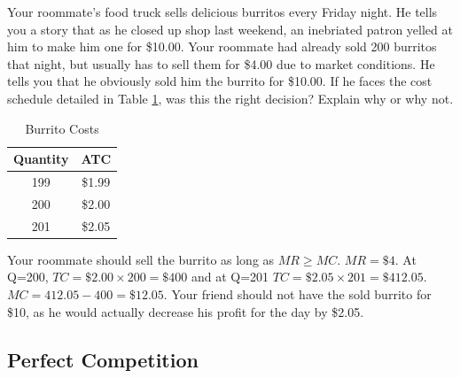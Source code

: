 \documentclass[addpoints,11pt]{exam}
\theoremstyle{definition}
\begin{document}
\begin{questions}
		\question Your roommate's food truck sells delicious burritos every Friday night. He tells you a story that as he closed up shop last weekend, an inebriated patron yelled at him to make him one for \$10.00. Your roommate had already sold 200 burritos that night, but usually has to sell them for \$4.00 due to market conditions. He tells you that he obviously sold him the burrito for \$10.00. If he faces the cost schedule detailed in Table \ref{tab5}, was this the right decision? Explain why or why not. 
		
		
		\begin{table}[H]
			\caption{Burrito Costs}
			\centering
			\begin{tabular}{ c|c}        
				
				Quantity  & ATC \\
				\hline
				199 & \$1.99 \\
				200 & \$2.00 \\
				201 & \$2.05 \\
			\end{tabular}
			\label{tab5}
		\end{table}
		
		\begin{solution}
			Your roommate should sell the burrito as long as $MR \ge MC$. $MR = \$4.$ At Q=200, $TC = \$2.00 \times 200 = \$400$ and at Q=201 $TC = \$2.05 \times 201 = \$412.05.$ $MC = 412.05 - 400 = \$12.05$. Your friend should not have the sold burrito for \$10, as he would actually decrease his profit for the day by \$2.05.
		\end{solution}

			
		\end{questions}
	
		
		\subsection*{Perfect Competition}
		
\end{document}
